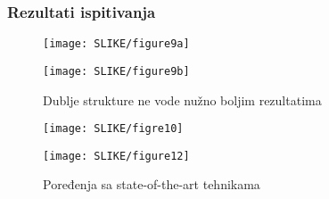 \documentclass{beamer}
\begin{document}
\begin{frame}
\frametitle{Rezultati ispitivanja}
\begin{figure}[ht]
        \begin{minipage}[b]{0.45\linewidth}
            \centering
            \texttt{[image: SLIKE/figure9a]}
        \end{minipage}
        \begin{minipage}[b]{0.45\linewidth}
            \centering
            \texttt{[image: SLIKE/figure9b]}
        \end{minipage}
    \caption{Dublje strukture ne vode nužno boljim rezultatima}
    \end{figure}
\begin{figure}[ht]
        \begin{minipage}[b]{0.45\linewidth}
            \centering
            \texttt{[image: SLIKE/figre10]}
        \end{minipage}
        \begin{minipage}[b]{0.45\linewidth}
            \centering
            \texttt{[image: SLIKE/figure12]}
        \end{minipage}
    \caption{Poređenja sa state-of-the-art tehnikama}
    \end{figure}

\end{frame}
\end{document}
